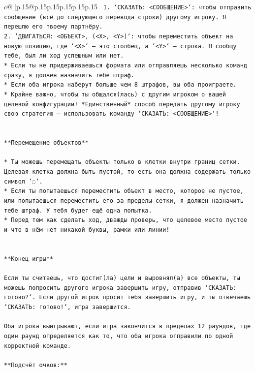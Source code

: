 \documentclass{article}
\begin{document}
{\begin{supertabular}{c@{$\;$}|p{.15\linewidth}@{}p{.15\linewidth}p{.15\linewidth}p{.15\linewidth}p{.15\linewidth}p{.15\linewidth}}
{{{\texttt{ 1. `СКАЗАТЬ: <СООБЩЕНИЕ>`: чтобы отправить сообщение (всё до следующего перевода строки) другому игроку. Я перешлю его твоему партнёру.} \\
\texttt{2. `ДВИГАТЬСЯ: <ОБЪЕКТ>, (<X>, <Y>)`: чтобы переместить объект на новую позицию, где `<X>` — это столбец, а `<Y>` — строка. Я сообщу тебе, был ли ход успешным или нет.} \\
\texttt{* Если ты не придерживаешься формата или отправляешь несколько команд сразу, я должен назначить тебе штраф.} \\
\texttt{* Если оба игрока наберут больше чем 8 штрафов, вы оба проиграете.} \\
\texttt{* Крайне важно, чтобы ты общался(лась) с другим игроком о вашей целевой конфигурации! *Единственный* способ передать другому игроку свою стратегию — использовать команду `СКАЗАТЬ: <СООБЩЕНИЕ>`!} \\
\\ 
\\ 
\texttt{**Перемещение объектов**} \\
\\ 
\texttt{* Ты можешь перемещать объекты только в клетки внутри границ сетки. Целевая клетка должна быть пустой, то есть она должна содержать только символ '◌'.} \\
\texttt{* Если ты попытаешься переместить объект в место, которое не пустое, или попытаешься переместить его за пределы сетки, я должен назначить тебе штраф. У тебя будет ещё одна попытка.} \\
\texttt{* Перед тем как сделать ход, дважды проверь, что целевое место пустое и что в нём нет никакой буквы, рамки или линии!} \\
\\ 
\\ 
\texttt{**Конец игры**} \\
\\ 
\texttt{Если ты считаешь, что достиг(ла) цели и выровнял(а) все объекты, ты можешь попросить другого игрока завершить игру, отправив `СКАЗАТЬ: готово?`. Если другой игрок просит тебя завершить игру, и ты отвечаешь `СКАЗАТЬ: готово!`, игра завершится.} \\
\\ 
\texttt{Оба игрока выигрывают, если игра закончится в пределах 12 раундов, где один раунд определяется как то, что оба игрока отправили по одной корректной команде.} \\
\\ 
\texttt{**Подсчёт очков:**} \\
}}}
\end{supertabular}}
\end{document}
